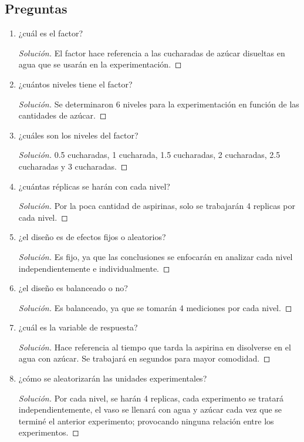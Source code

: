 \documentclass[a4paper,12pt]{article}
\newenvironment{solution}
  {\renewcommand\qedsymbol{$\blacksquare$}\begin{proof}[Solución]}
  {\end{proof}}
\begin{document}
\subsection{Preguntas}
\begin{enumerate}
    \item ¿cuál es el factor?
    \begin{solution}
    El factor hace referencia a las cucharadas de azúcar disueltas en agua que se usarán en la experimentación. 
    \end{solution}
    \item ¿cuántos niveles tiene el factor?
    \begin{solution}
    Se determinaron 6 niveles para la experimentación en función de las cantidades de azúcar.
    \end{solution}
    \item ¿cuáles son los niveles del factor?
    \begin{solution}
    0.5 cucharadas, 1 cucharada, 1.5 cucharadas, 2 cucharadas, 2.5 cucharadas y 3 cucharadas.
    \end{solution}
    \item ¿cuántas réplicas se harán con cada nivel?
    \begin{solution}
    Por la poca cantidad de aspirinas, solo se trabajarán 4 replicas por cada nivel. 
    \end{solution}
    \item ¿el diseño es de efectos fijos o aleatorios?
    \begin{solution}
    Es fijo, ya que las conclusiones se enfocarán en analizar cada nivel independientemente e individualmente.
    \end{solution}
    \item ¿el diseño es balanceado o no?
    \begin{solution}
    Es balanceado, ya que se tomarán 4 mediciones por cada nivel. 
    \end{solution}
    \item ¿cuál es la variable de respuesta?
    \begin{solution}
    Hace referencia al tiempo que tarda la aspirina en disolverse en el agua con azúcar. Se trabajará en segundos para mayor comodidad.
    \end{solution}
    \item ¿cómo se aleatorizarán las unidades experimentales?
    \begin{solution}
   Por cada nivel, se harán 4 replicas, cada experimento se tratará independientemente, el vaso se llenará con agua y azúcar cada vez que se terminé el anterior experimento; provocando ninguna relación entre los experimentos. 
    \end{solution}
\end{enumerate}
\end{document}
